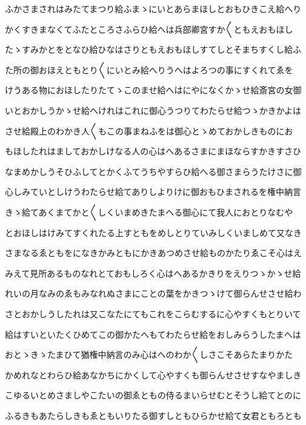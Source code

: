 \documentclass[a4paper,11pt,landscape]{ltjtarticle}
\begin{document}
\par\medskip
ふかさまされはみたてまつり給ふまゝにいとあらまほしとおもひきこえ給へり
\par\medskip
かくすきまなくてふたところさふらひ給へは兵部卿宮すか〱ともえおもほし
\par\medskip
たゝすみかとをとなひ給ひなはさりともえおもほしすてしとそまちすくし給ふ
\par\medskip
た所の御おほえともとり〱にいとみ給へりうへはよろつの事にすくれてゑを
\par\medskip
けうある物におほしたりたてゝこのませ給へはにやになくかゝせ給斎宮の女御
\par\medskip
いとおかしうかゝせ給へけれはこれに御心うつりてわたらせ給つゝかきかよは
\par\medskip
させ給殿上のわかき人〱もこの事まねふをは御心とゝめておかしきものにお
\par\medskip
もほしたれはましておかしけなる人の心はへあるさまにまほならすかきすさひ
\par\medskip
なまめかしうそひふしてとかくふてうちやすらひ給へる御さまらうたけさに御
\par\medskip
心しみていとしけうわたらせ給てありしよりけに御おもひまされるを権中納言
\par\medskip
きゝ給てあくまてかと〱しくいまめきたまへる御心にて我人におとりなむや
\par\medskip
とおほしはけみてすくれたる上すともをめしとりていみしくいましめて又なき
\par\medskip
さまなるゑともをになきかみともにかきあつめさせ給ものかたりゑこそ心はえ
\par\medskip
みえて見所あるものなれとておもしろく心はへあるかきりをえりつゝかゝせ給
\par\medskip
れいの月なみのゑもみなれぬさまにことの葉をかきつゝけて御らんせさせ給わ
\par\medskip
さとおかしうしたれは又こなたにてもこれをこらむするに心やすくもとりいて
\par\medskip
給はすいといたくひめてこの御かたへもてわたらせ給をおしみらうしたまへは
\par\medskip
おとゝきゝたまひて猶権中納言のみ心はへのわか〱しさこそあらたまりかた
\par\medskip
かめれなとわらひ給あなかちにかくして心やすくも御らんせさせすなやましき
\par\medskip
こゆるいとめさましやこたいの御ゑともの侍るまいらせむとそうし給てとのに
\par\medskip
ふるきもあたらしきもゑともいりたる御すしともひらかせ給て女君ともろとも
\par\medskip
\end{document}
